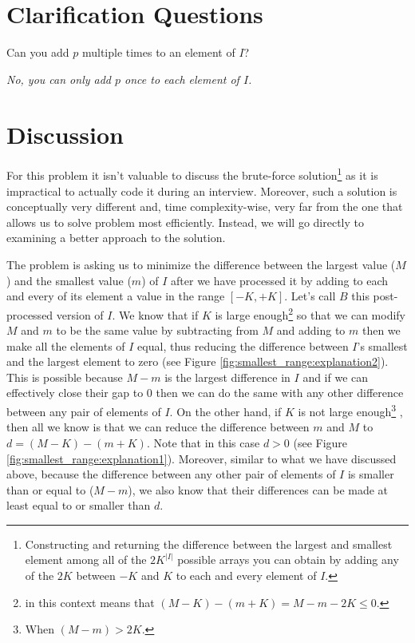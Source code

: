 \section{Clarification Questions}

\begin{QandA}
	\item \begin{questionitem} \begin{question} Can you add $p$ multiple times to an element of $I$?  \end{question} 	 
    \begin{answered}
		\textit{No, you can only add $p$ once to each element of $I$.}
	\end{answered} \end{questionitem}	
\end{QandA}

\section{Discussion}
\label{smallest_range:sec:discussionMain}
For this problem it isn't valuable to discuss the brute-force solution\footnote{Constructing
	and returning the difference between the largest and smallest element among all of the
	$2K^{|I|}$ possible arrays you can obtain by adding any of the $2K$ between $-K$ and $K$ to each
	and every element of $I$.} as it is impractical to actually code it during an interview.
	Moreover, such a solution is conceptually very different and,  time complexity-wise, very far from the one that allows us to solve problem most efficiently. Instead, we will go directly to examining a better approach to the solution. 
	

The problem is asking us to minimize the difference between the largest value ($M$) and the smallest
value ($m$) of $I$ after we have processed it by adding to each and every of its element a value in
the range $[-K,+K]$. Let's call $B$ this post-processed version of $I$. We know that if $K$ is large
enough\footnote{  in this context means that $(M-K) - (m+K) = M-m-2K \leq 0$.} so
that we can modify $M$ and $m$ to be the same value by subtracting from $M$ and adding to $m$ then
we make all the elements of $I$ equal, thus reducing the difference between $I$'s smallest and the
largest element to zero (see Figure \ref{fig:smallest_range:explanation2}). This is possible because
$M-m$ is the  largest difference in $I$ and if we can effectively close their gap to $0$ then we can
do the same with any other difference between any pair of elements of $I$. On the other hand, if $K$
is not large enough\footnote{When $(M-m) > 2K$.} , then all we know is that we can reduce the
difference between $m$ and $M$ to $d=(M-K)-(m+K)$. Note that in this case $d > 0$  (see Figure
\ref{fig:smallest_range:explanation1}). Moreover, similar to what we have discussed above, because
the difference between any other pair of elements of $I$ is smaller than or equal to ($M-m$), we also
know that their differences can be made at least equal to or smaller than $d$.


